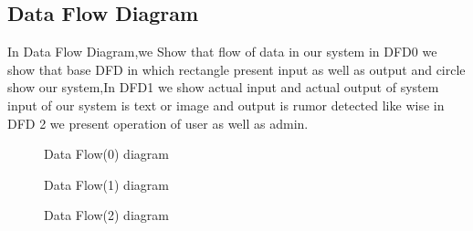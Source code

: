 \documentclass[oneside,a4paper,12pt]{report}
\begin{document}
\subsection {Data Flow Diagram}
\item In Data Flow Diagram,we Show that ﬂow of data in our system in DFD0 we show that base DFD in which rectangle present input as well as output and circle show our system,In DFD1 we show actual input and actual output of system input of our system is text or image and output is rumor detected like wise in DFD 2 we present operation of user as well as admin.\\
\begin{center}
	\begin{figure}[!htbp]
		\centering
	  \caption{Data Flow(0) diagram}
	  \label{fig:act-dig}
	\end{figure}
\end{center}  
\newpage 
\begin{center}
	\begin{figure}[!htbp]
		\centering
	  \caption{Data Flow(1) diagram}
	  \label{fig:act-dig}
	\end{figure}
\end{center}  

\begin{center}
	\begin{figure}[!htbp]
		\centering
	  \caption{Data Flow(2) diagram}
	  \label{fig:act-dig}
	\end{figure}
\end{center}  
\newpage
\end{document}
